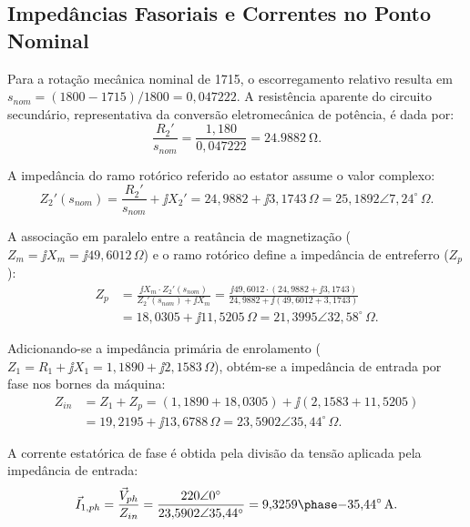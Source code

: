 \subsection{Impedâncias Fasoriais e Correntes no Ponto Nominal}\label{subsec:impedancias_nominal}

Para a rotação mecânica nominal de \SI{1715}{\RPM}, o escorregamento relativo resulta em $s_{nom} = (1800 - 1715)/1800 = 0{,}047222$. A resistência aparente do circuito secundário, representativa da conversão eletromecânica de potência, é dada por:
\begin{equation}
\frac{R_2'}{s_{nom}} = \frac{1{,}180}{0{,}047222} = \SI{24,9882}{\ohm}.
\label{eq:resistencia_aparente_rotor}
\end{equation}

A impedância do ramo rotórico referido ao estator assume o valor complexo:
\begin{equation}
Z_2'(s_{nom}) = \frac{R_2'}{s_{nom}} + \jj X_2' = 24{,}9882 + \jj 3{,}1743\,\Omega = 25{,}1892 \angle 7{,}24^\circ\,\Omega.
\label{eq:impedancia_rotor_nominal}
\end{equation}

A associação em paralelo entre a reatância de magnetização ($Z_m = \jj X_m = \jj 49{,}6012\,\Omega$) e o ramo rotórico define a impedância de entreferro ($Z_p$):
\begin{align}
Z_p &= \frac{\jj X_m \cdot Z_2'(s_{nom})}{Z_2'(s_{nom}) + \jj X_m} = \frac{\jj 49{,}6012 \cdot (24{,}9882 + \jj 3{,}1743)}{24{,}9882 + \jj (49{,}6012 + 3{,}1743)} \nonumber \\
    &= 18{,}0305 + \jj 11{,}5205\,\Omega = 21{,}3995 \angle 32{,}58^\circ\,\Omega.
\label{eq:impedancia_paralelo_nominal}
\end{align}

Adicionando-se a impedância primária de enrolamento ($Z_1 = R_1 + \jj X_1 = 1{,}1890 + \jj 2{,}1583\,\Omega$), obtém-se a impedância de entrada por fase nos bornes da máquina:
\begin{align}
Z_{in} &= Z_1 + Z_p = (1{,}1890 + 18{,}0305) + \jj (2{,}1583 + 11{,}5205) \nonumber \\
       &= 19{,}2195 + \jj 13{,}6788\,\Omega = 23{,}5902 \angle 35{,}44^\circ\,\Omega.
\label{eq:impedancia_entrada_nominal}
\end{align}

A corrente estatórica de fase é obtida pela divisão da tensão aplicada pela impedância de entrada:
\begin{equation}
\vec{I}_{1,ph} = \frac{\vec{V}_{ph}}{Z_{in}} = \frac{220 \angle 0^\circ}{23{,}5902 \angle 35{,}44^\circ} = \phasor{9{,}3259}{-35{,}44}\,\text{A}.
\label{eq:corrente_fase_nominal}
\end{equation}

